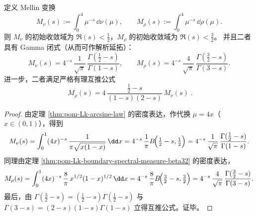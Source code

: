 \begin{proposition}\label{prop:pom-Lk-mellin-transform-rigidity}
定义 Mellin 变换
\[
M_\nu(s):=\int_{0}^{4}\mu^{-s}\,\dd\nu(\mu),
\qquad
M_\rho(s):=\int_{0}^{4}\mu^{-s}\,\dd\rho(\mu).
\]
则 \(M_\nu\) 的初始收敛域为 \(\Re(s)<\tfrac12\)，\(M_\rho\) 的初始收敛域为 \(\Re(s)<\tfrac32\)。
并且二者具有 Gamma 闭式（从而可作解析延拓）：
\[
M_\nu(s)=4^{-s}\,\frac{1}{\sqrt\pi}\,\frac{\Gamma(\tfrac12-s)}{\Gamma(1-s)},
\qquad
M_\rho(s)=4^{-s}\,\frac{4}{\sqrt\pi}\,\frac{\Gamma(\tfrac32-s)}{\Gamma(3-s)}.
\]
进一步，二者满足严格有理互推公式
\[
\boxed{\;
M_\rho(s)=4\,\frac{\tfrac12-s}{(1-s)(2-s)}\,M_\nu(s)\; }.
\]
\end{proposition}
\begin{proof}
由定理 \ref{thm:pom-Lk-arcsine-law} 的密度表达，作代换 \(\mu=4x\)（\(x\in(0,1)\)），得到
\[
M_\nu(s)
=\int_{0}^{1}(4x)^{-s}\,\frac{1}{\pi\sqrt{x(1-x)}}\,\dd x
=4^{-s}\,\frac{1}{\pi}B\!\Bigl(\tfrac12-s,\tfrac12\Bigr)
=4^{-s}\,\frac{1}{\sqrt\pi}\,\frac{\Gamma(\tfrac12-s)}{\Gamma(1-s)}.
\]
同理由定理 \ref{thm:pom-Lk-boundary-spectral-measure-beta32} 的密度表达，
\[
M_\rho(s)
=\int_{0}^{1}(4x)^{-s}\,\frac{8}{\pi}\,x^{1/2}(1-x)^{1/2}\,\dd x
=4^{-s}\,\frac{8}{\pi}B\!\Bigl(\tfrac32-s,\tfrac32\Bigr)
=4^{-s}\,\frac{4}{\sqrt\pi}\,\frac{\Gamma(\tfrac32-s)}{\Gamma(3-s)}.
\]
最后，由 \(\Gamma(\tfrac32-s)=(\tfrac12-s)\Gamma(\tfrac12-s)\) 与 \(\Gamma(3-s)=(2-s)(1-s)\Gamma(1-s)\) 立得互推公式。证毕。
\end{proof}

